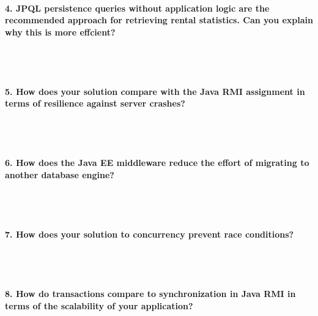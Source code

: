 \documentclass{ds-report}
\begin{document}
	\paragraph{4. JPQL persistence queries without application logic are the recommended approach for retrieving rental statistics. Can you explain why this is more effcient?} \mbox{}\\\\





	\paragraph{5. How does your solution compare with the Java RMI assignment in terms of resilience against server crashes?} \mbox{}\\\\





	\paragraph{6. How does the Java EE middleware reduce the effort of migrating to another database engine?} \mbox{}\\\\





 

	\paragraph{7. How does your solution to concurrency prevent race conditions?} \mbox{}\\\\






	\paragraph{8. How do transactions compare to synchronization in Java RMI in terms of the scalability of your application?} \mbox{}\\\\
\end{document}
